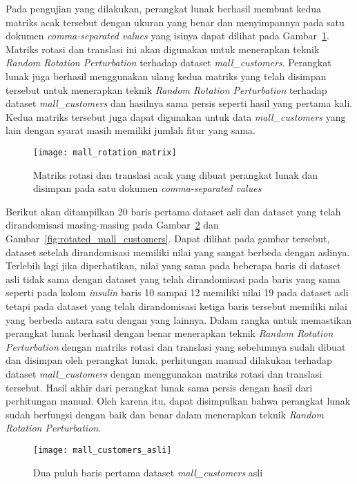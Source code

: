 Pada pengujian yang dilakukan, perangkat lunak berhasil membuat kedua matriks acak tersebut dengan ukuran yang benar dan menyimpannya pada satu dokumen \textit{comma-separated values} yang isinya dapat dilihat pada Gambar~\ref{fig:mall_rotation_matrix}. Matriks rotasi dan translasi ini akan digunakan untuk menerapkan teknik \textit{Random Rotation Perturbation} terhadap dataset \textit{mall\_customers}. Perangkat lunak juga berhasil menggunakan ulang kedua matriks yang telah disimpan tersebut untuk menerapkan teknik \textit{Random Rotation Perturbation} terhadap dataset \textit{mall\_customers} dan hasilnya sama persis seperti hasil yang pertama kali. Kedua matriks tersebut juga dapat digunakan untuk data \textit{mall\_customers} yang lain dengan syarat masih memiliki jumlah fitur yang sama.

\begin{figure}
	\centering
	\texttt{[image: mall\_rotation\_matrix]}
	\caption{Matriks rotasi dan translasi acak yang dibuat perangkat lunak dan disimpan pada satu dokumen  \textit{comma-separated values}}
	\label{fig:mall_rotation_matrix}
\end{figure}

Berikut akan ditampilkan 20 baris pertama dataset asli dan dataset yang telah dirandomisasi masing-masing pada Gambar~\ref{fig:mall_customers_asli} dan Gambar~\ref{fig:rotated_mall_customers}. Dapat dilihat pada gambar tersebut, dataset setelah dirandomisasi memiliki nilai yang sangat berbeda dengan aslinya. Terlebih lagi jika diperhatikan, nilai yang sama pada beberapa baris di dataset asli tidak sama dengan dataset yang telah dirandomisasi pada baris yang sama seperti pada kolom \textit{insulin} baris 10 sampai 12 memiliki nilai 19 pada dataset asli tetapi pada dataset yang telah dirandomisasi ketiga baris tersebut memiliki nilai yang berbeda antara satu dengan yang lainnya. Dalam rangka untuk memastikan perangkat lunak berhasil dengan benar menerapkan teknik \textit{Random Rotation Perturbation} dengan matriks rotasi dan translasi yang sebelumnya sudah dibuat dan disimpan oleh perangkat lunak, perhitungan manual dilakukan terhadap dataset \textit{mall\_customers} dengan menggunakan matriks rotasi dan translasi tersebut. Hasil akhir dari perangkat lunak sama persis dengan hasil dari perhitungan manual. Oleh karena itu, dapat disimpulkan bahwa perangkat lunak sudah berfungsi dengan baik dan benar dalam menerapkan teknik \textit{Random Rotation Perturbation}.

\begin{figure}
	\centering
	\texttt{[image: mall\_customers\_asli]}
	\caption{Dua puluh baris pertama dataset \textit{mall\_customers} asli}
	\label{fig:mall_customers_asli}
\end{figure}

